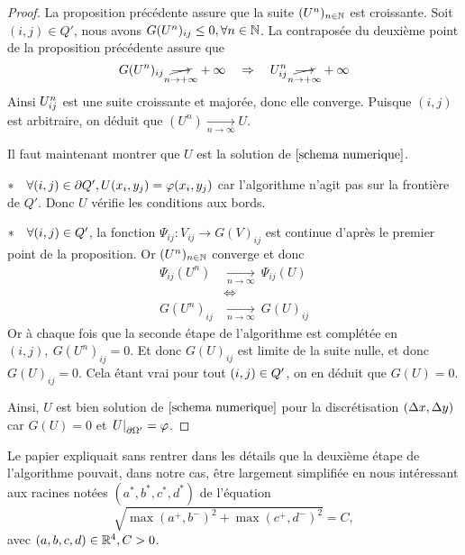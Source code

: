 \begin{proof}
    La proposition précédente assure que la suite $(U^n)_{n\in\mathbb{N}}$ est croissante. Soit $(i,j)\in Q'$, nous avons $G(U^n)_{ij} \leq 0 , \forall n\in\mathbb{N}$. La contraposée du deuxième point de la proposition précédente assure que 
    \begin{equation*}
        G(U^n)_{ij} \underset{n\rightarrow +\infty}{\cancel{\longrightarrow}} +\infty \quad \Rightarrow \quad U_{ij}^n \underset{n\rightarrow +\infty}{\cancel{\longrightarrow}} +\infty
    \end{equation*}
    Ainsi $U_{ij}^n$ est une suite croissante et majorée, donc elle converge. Puisque $(i,j)$ est arbitraire, on déduit que $(U^n) \underset{n \rightarrow \infty}{\longrightarrow} U$.

    Il faut maintenant montrer que $U$ est la solution de $\eqref{schema numerique}$.
    
    $\ast \quad \forall (i,j)\in \mathop{}\!{\partial} Q', U(x_i,y_j)=\varphi(x_i,y_j) $ car l'algorithme n'agit pas sur la frontière de $Q'$. Donc $U$ vérifie les conditions aux bords.

    $\ast \quad \forall (i,j)\in Q'$, la fonction $\Psi_{ij}:V_{ij}\rightarrow G(V)_{ij}$ est continue d'après le premier point de la proposition. Or $(U^n)_{n\in \mathbb{N}}$ converge et donc 
    \begin{equation*}
        \begin{split}
            \Psi_{ij}(U^n) &\underset{n \rightarrow \infty}{\longrightarrow} \ \Psi_{ij}(U)\\
            &\Leftrightarrow \\
            G(U^n)_{ij} &\underset{n \rightarrow \infty}{\longrightarrow} \ G(U)_{ij}
        \end{split}
    \end{equation*}
    Or à chaque fois que la seconde étape de l'algorithme est complétée en $(i,j), \ G(U^n)_{ij}=0$. Et donc $G(U)_{ij}$ est limite de la suite nulle, et donc $G(U)_{ij}=0$. Cela étant vrai pour tout $(i,j)\in Q'$, on en déduit que $G(U)=0$. 
    
    Ainsi, $U$ est bien solution de $\eqref{schema numerique}$ pour la discrétisation $(\Delta x,\Delta y)$ car $G(U)=0$ et $\left. U \right|_{\mathop{}\!{\partial} \Omega'}=\varphi$. 
\end{proof}

Le papier expliquait sans rentrer dans les détails que la deuxième étape de l'algorithme pouvait, dans notre cas, être largement simplifiée en nous intéressant aux racines notées $(a^*,b^*,c^*,d^*)$ de l'équation 
\begin{equation}\label{eq:algo}
    \sqrt{\max\left(a^+,b^-\right)^2 + \max\left(c^+,d^-\right)^2} = C, 
\end{equation}
avec $(a,b,c,d)\in \mathbb{R}^4, C>0$.

